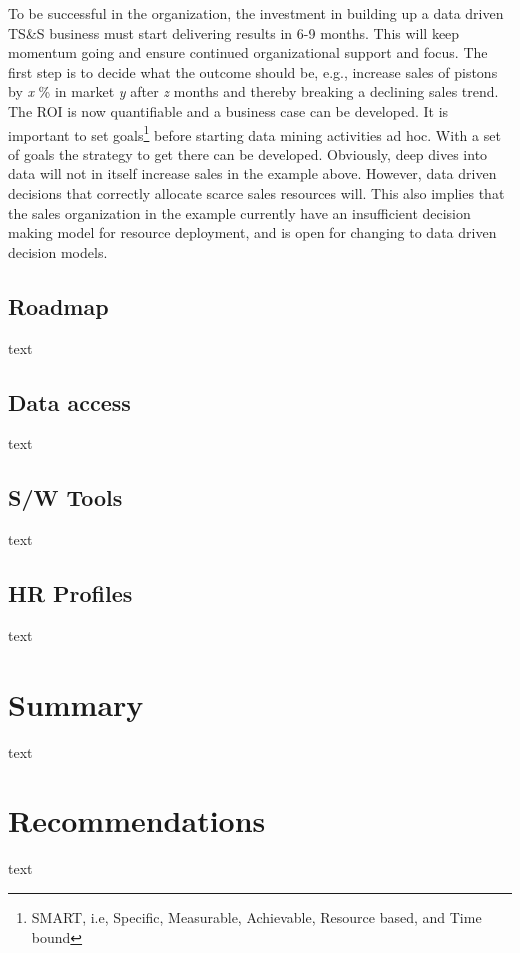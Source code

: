 \documentclass[10pt]{article} %
\begin{document}
To be successful in the organization, the investment in building up a data driven TS\&S business must start delivering results in 6-9 months. This will keep momentum going and ensure continued organizational support and focus. The first step is to decide what the outcome should be, e.g., increase sales of pistons by \textit{x} \% in market \textit{y} after \textit{z} months and thereby breaking a declining sales trend. The ROI is now quantifiable and a business case can be developed. It is important to set goals\footnote{SMART, i.e, Specific, Measurable, Achievable, Resource based, and Time bound} before starting data mining activities ad hoc. With a set of goals the strategy to get there can be developed. Obviously, deep dives into data will not in itself increase sales in the example above. However, data driven decisions that correctly allocate scarce sales resources will. This also implies that the sales organization in the example currently have an insufficient decision making model for resource deployment, and is open for changing to data driven decision models.


\subsection{Roadmap}

text

\subsection{Data access}

text

\subsection{S/W Tools}

text

\subsection{HR Profiles}

text


\section{Summary}

text

\section{Recommendations}

text
\end{document}
